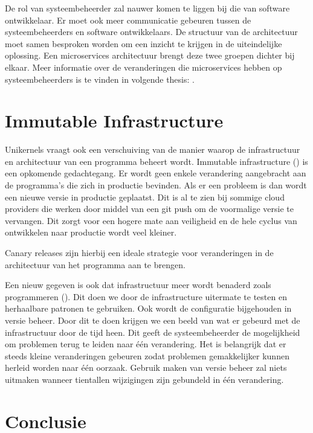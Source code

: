 \documentclass[pdftex,a4paper,12pt,twoside]{report}
\begin{document}
De rol van systeembeheerder zal nauwer komen te liggen bij die van software ontwikkelaar. Er moet ook meer communicatie gebeuren tussen de systeembeheerders en software ontwikkelaars. De structuur van de architectuur moet samen besproken worden om een inzicht te krijgen in de uiteindelijke oplossing. Een microservices architectuur brengt deze twee groepen dichter bij elkaar. Meer informatie over de veranderingen die microservices hebben op systeembeheerders is te vinden in volgende thesis: \cite{balalaie_microservices_2016}.

\chapter{Immutable Infrastructure}

Unikernels vraagt ook een verschuiving van de manier waarop de infrastructuur en architectuur van een programma beheert wordt. Immutable infrastructure (\cite{martin_fowler_phoenixserver_2012}) is een opkomende gedachtegang. Er wordt geen enkele verandering aangebracht aan de programma's die zich in productie bevinden. Als er een probleem is dan wordt een nieuwe versie in productie geplaatst. Dit is al te zien bij sommige cloud providers die werken door middel van een git push om de voormalige versie te vervangen. Dit zorgt voor een hogere mate aan veiligheid en de hele cyclus van ontwikkelen naar productie wordt veel kleiner.

Canary releases zijn hierbij een ideale strategie voor veranderingen in de architectuur van het programma aan te brengen.

Een nieuw gegeven is ook dat infrastructuur meer wordt benaderd zoals programmeren (\cite{morris_infrastructure_2016}). Dit doen we door de infrastructure uitermate te testen en herhaalbare patronen te gebruiken. Ook wordt de configuratie bijgehouden in versie beheer. Door dit te doen krijgen we een beeld van wat er gebeurd met de infrastructuur door de tijd heen. Dit geeft de systeembeheerder de mogelijkheid om problemen terug te leiden naar één verandering. Het is belangrijk dat er steeds kleine veranderingen gebeuren zodat problemen gemakkelijker kunnen herleid worden naar één oorzaak. Gebruik maken van versie beheer zal niets uitmaken wanneer tientallen wijzigingen zijn gebundeld in één verandering.

\chapter{Conclusie}
\label{ch:conclusie}
\end{document}
